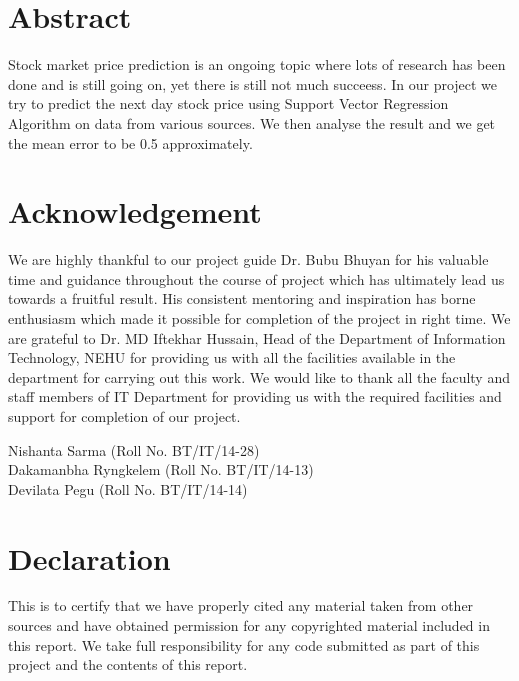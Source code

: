 \documentclass{report}
\begin{document}
\chapter*{Abstract}
 Stock market price prediction is an ongoing topic where lots of research has been done and is still going on, yet there is still not much succeess. In our project we try to predict the next day stock price using Support Vector Regression Algorithm on data from various sources. We then analyse the result and we get the mean error to be 0.5 approximately.     
\chapter*{Acknowledgement}
We are highly thankful to our project guide Dr. Bubu Bhuyan for his valuable time and guidance throughout the course of project which has ultimately lead us towards a fruitful result. His consistent mentoring and inspiration has borne enthusiasm  which made it possible for completion of the project in right time.
\newline
We are grateful to Dr. MD Iftekhar Hussain, Head of the Department of Information Technology, NEHU for providing us with all the facilities available in the department for carrying out this work.
We would like to thank all the faculty and staff members of IT Department for providing us with the required facilities and support for completion of our project.

\vspace{7cm}

\begin{flushright}
Nishanta Sarma (Roll No. BT/IT/14-28)\\
Dakamanbha Ryngkelem (Roll No. BT/IT/14-13)\\
Devilata Pegu (Roll No. BT/IT/14-14)\\
\end{flushright}

\chapter*{Declaration}
This is to certify that we have properly cited any material taken from other sources and have obtained permission for any copyrighted material included in this report. We take full responsibility for any code submitted as part of this  project and the contents of this report.\\
\vspace{7cm}
\end{document}

